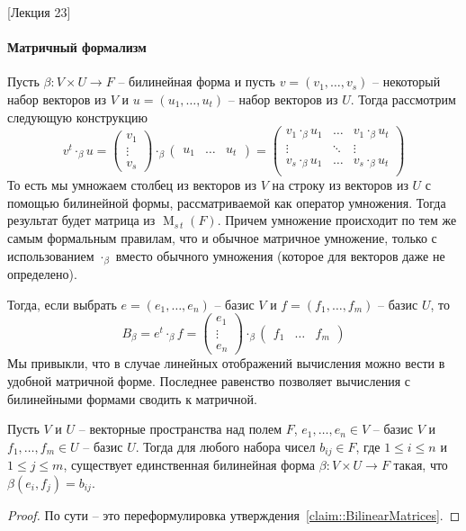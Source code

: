 [Лекция 23]

\paragraph{Матричный формализм}

Пусть $\beta\colon V\times U\to F$ -- билинейная форма и пусть $v = (v_1,\ldots,v_s)$ -- некоторый набор векторов из $V$ и $u = (u_1,\ldots,u_t)$ -- набор векторов из $U$. Тогда рассмотрим следующую конструкцию
\[
v^t\cdot_\beta u = 
\begin{pmatrix}
{v_1}\\{\vdots}\\{v_s}
\end{pmatrix}
\cdot_\beta
\begin{pmatrix}
{u_1}&{\ldots}&{u_t}
\end{pmatrix}
=
\begin{pmatrix}
{v_1\cdot_\beta u_1}&{\ldots}&{v_1\cdot_\beta u_t}\\
{\vdots}&{\ddots}&{\vdots}\\
{v_s\cdot_\beta u_1}&{\ldots}&{v_s\cdot_\beta u_t}\\
\end{pmatrix}
\]
То есть мы умножаем столбец из векторов из $V$ на строку из векторов из $U$ с помощью билинейной формы, рассматриваемой как оператор умножения. Тогда результат будет матрица из $\operatorname{M}_{s\,t}(F)$. Причем умножение происходит по тем же самым формальным правилам, что и обычное матричное умножение, только с использованием $\cdot_\beta$ вместо обычного умножения (которое для векторов даже не определено).



Тогда, если выбрать $e = (e_1,\ldots,e_n)$ -- базис $V$ и $f = (f_1,\ldots,f_m)$ -- базис $U$, то 
\[
B_\beta = e^t\cdot_\beta f = 
\begin{pmatrix}
{e_1}\\{\vdots}\\{e_n}
\end{pmatrix}
\cdot_\beta
\begin{pmatrix}
{f_1}&{\ldots}&{f_m}
\end{pmatrix}
\]
Мы привыкли, что в случае линейных отображений вычисления можно вести в удобной матричной форме. Последнее равенство позволяет вычисления с билинейными формами сводить к матричной.

\begin{claim}
Пусть $V$ и $U$ -- векторные пространства над полем $F$, $e_1,\ldots,e_n \in V$ -- базис $V$ и $f_1,\ldots,f_m\in U$ -- базис $U$. Тогда для любого набора чисел $b_{ij}\in F$, где $1\leqslant i \leqslant n$ и $1\leqslant j \leqslant m$, существует единственная билинейная форма $\beta\colon V\times U\to F$ такая, что $\beta(e_i,f_j) = b_{ij}$.
\end{claim}
\begin{proof}
По сути -- это переформулировка утверждения~\ref{claim::BilinearMatrices}.
\end{proof}


